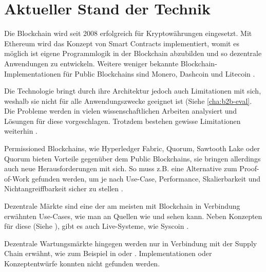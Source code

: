 \chapter{Aktueller Stand der Technik}
\label{cha:stand-technik}

Die Blockchain wird seit 2008 erfolgreich für Kryptowährungen eingesetzt. Mit Ethereum wird das Konzept von Smart Contracts implementiert, womit es möglich ist eigene Programmlogik in der Blockchain abzubilden und so dezentrale Anwendungen zu entwickeln. Weitere weniger bekannte Blockchain-Implementationen für Public Blockchains sind Monero, Dashcoin und Litecoin \cite{BlockchainHubBlockchainsDistributedLedger}. 

Die Technologie bringt durch ihre Architektur jedoch auch Limitationen mit sich, weshalb sie nicht für alle Anwendungszwecke geeignet ist (Siehe \ref{cha:b2b-eval}. Die Probleme werden in vielen wissenschaftlichen Arbeiten analysiert und Lösungen für diese vorgeschlagen. Trotzdem bestehen gewisse Limitationen weiterhin \cite{ZhengBlockchainChallengesOpportunities2017}\cite{SwanBlockchainblueprintnew2015}\cite{SchererPerformanceScalabilityBlockchain2017}.

Permissioned Blockchains, wie Hyperledger Fabric, Quorum, Sawtooth Lake oder Quorum bieten Vorteile gegenüber dem Public Blockchains, sie bringen allerdings auch neue Herausforderungen mit sich. So muss z.B. eine Alternative zum Proof-of-Work gefunden werden, um je nach Use-Case, Performance, Skalierbarkeit und Nichtangreiffbarkeit sicher zu stellen \cite{LiScalablePrivateIndustrial2017}.

Dezentrale Märkte sind eine der am meisten mit Blockchain in Verbindung erwähnten Use-Cases, wie man an Quellen wie \cite{BenHamidaBlockchainEnterpriseOverview2017} und \cite{RavalDecentralizedApplicationsHarnessing2016} sehen kann.
Neben Konzepten für diese (Siehe \cite{KaiserDecentralizedPrivateMarketplace}), gibt es auch Live-Systeme, wie Syscoin \cite{SidhuSyscoinPeertoPeerElectronic2017}.

Dezentrale Wartungsmärkte hingegen werden nur in Verbindung mit der Supply Chain erwähnt, wie zum Beispiel in \cite{SoldatosWhatDoesBlockchain} oder \cite{GotzeLufthansaIndustrySolutions}. Implementationen oder Konzeptentwürfe konnten nicht gefunden werden.




